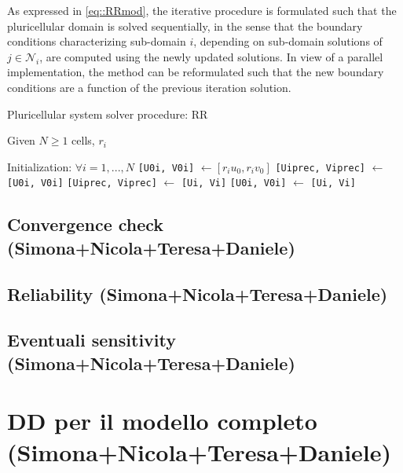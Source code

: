 \documentclass[a4paper]{siamonline220329}
\begin{document}
As expressed in \eqref{eq::RRmod}, the iterative procedure is formulated such that the pluricellular domain is solved sequentially, in the sense that the boundary conditions characterizing sub-domain $i$, depending on sub-domain solutions of $j \in \mathcal{N}_i$, are computed using the newly updated solutions. In view of a parallel implementation, the method can be reformulated such that the new boundary conditions are a function of the previous iteration solution.

\begin{algorithm}[t]
    \caption{Pluricellular system solver procedure: RR}
    \label{alg:RRmod}
    Given $N \geq 1$ cells, $r_i$
    \begin{algorithmic}[1]
    \STATE Initialization: $\forall i = 1, ..., N$
    \STATE \verb|[U0i, V0i]| $\gets [r_i u_0, r_i v_0]$
    \STATE \verb|[Uiprec, Viprec]| $\gets$  \verb|[U0i, V0i]|
    \STATE \verb|[Uiprec, Viprec]| $\gets$  \verb|[Ui, Vi]|
    \ENDFOR
    \STATE \verb|[U0i, V0i]| $\gets$  \verb|[Ui, Vi]|
    \ENDWHILE
    \end{algorithmic}
\end{algorithm}

\subsection{Convergence check (Simona+Nicola+Teresa+Daniele)}
\subsection{Reliability (Simona+Nicola+Teresa+Daniele)}
\subsection{Eventuali sensitivity (Simona+Nicola+Teresa+Daniele)}

\section{DD per il modello completo (Simona+Nicola+Teresa+Daniele)}

\end{document}
